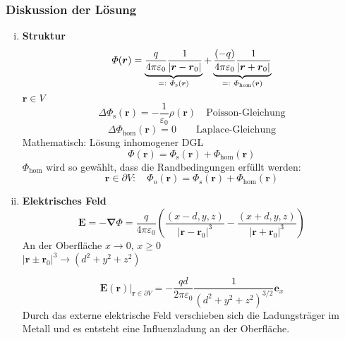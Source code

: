 \documentclass[titlepage,11pt,a4paper,ngerman]{report}
\newcommand*{\eqdef}{=\mathrel{\vcenter{\baselineskip0.5ex \lineskiplimit0pt \hbox{\scriptsize.}\hbox{\scriptsize.}}}}
\newcommand{\tx}[1]{\textrm{#1}}
\newcommand{\eofr}{\vec{E}(\vec{r})}
\newcommand{\pofr}{\Phi(\vec{r})}
\renewcommand{\Phi}{\varPhi}
\renewcommand{\vec}[1]{\boldsymbol{#1}}
\newcommand{\lcom}[1]{\color{MidnightBlue}#1\color{black}}
\renewcommand{\epsilon}{\varepsilon}
\begin{document}
\subsubsection{Diskussion der Lösung}
\begin{enumerate}[i)]
	\item \textbf{Struktur}
	$$\pofr = \underbrace{\frac{q}{4 \pi \epsilon_0} \frac{1}{|\vec{r}-\vec{r}_0|}}_{\eqdef\ \Phi_{\textrm{s}}(\vec{r})} + \underbrace{\frac{(-q)}{4 \pi \epsilon_0} \frac{1}{|\vec{r}+\vec{r}_0|}}_{\eqdef\ \Phi_{\textrm{hom}}(\vec{r})}$$ 
	$ \vec{r} \in V $
	\begin{equation*}
	\Delta \Phi_\tx{s}(\vec{r}) = - \frac{1}{\epsilon_0} \rho(\vec{r}) \quad \tx{Poisson-Gleichung}
	\end{equation*}
	\begin{equation*}
	\Delta \Phi_{\tx{hom}} (\vec{r}) = 0 \qquad \tx{Laplace-Gleichung}
	\end{equation*}
	Mathematisch: Lösung inhomogener DGL
	\begin{equation*}
	\pofr = \Phi_\tx{s}(\vec{r}) + \Phi_{\tx{hom}}(\vec{r})
	\end{equation*}
	$ \Phi_{\tx{hom}} $ wird so gewählt, dass die Randbedingungen erfüllt werden:
	\begin{equation*}
	\vec{r} \in \partial V: \quad \Phi_\tx{o} (\vec{r}) = \Phi_\tx{s}(\vec{r}) + \Phi_{\tx{hom}}(\vec{r})
	\end{equation*}	
	\item \textbf{Elektrisches Feld}
	\begin{equation*}
	\vec{E} = - \vec{\nabla} \Phi = \frac{q}{4 \pi \epsilon_0} \left(\frac{(x-d,y,z)}{|\vec{r} - \vec{r}_0|^3} - \frac{(x+d,y,z)}{|\vec{r} + \vec{r}_0|^3}\right)
	\end{equation*}
	An der Oberfläche $ x \to 0 $, $ x \ge 0 $\\
	$ |\vec{r} \pm \vec{r}_0|^3 \rightarrow (d^2 + y^2 + z^2) $\\
	\begin{minipage}{.5\linewidth}
		\begin{equation*}
		\eofr \bigg|_{\vec{r} \in \partial V} = - \frac{qd}{2 \pi \epsilon_0} \frac{1}{(d^2 + y^2 + z^2) ^{3/2}} \vec{e}_x
		\end{equation*}
		\lcom{Durch das externe elektrische Feld verschieben sich die Ladungsträger im Metall und es entsteht eine Influenzladung an der Oberfläche.}
	\end{minipage}
	\begin{minipage}{.5\linewidth}

\end{minipage}
\end{enumerate}
\end{document}
